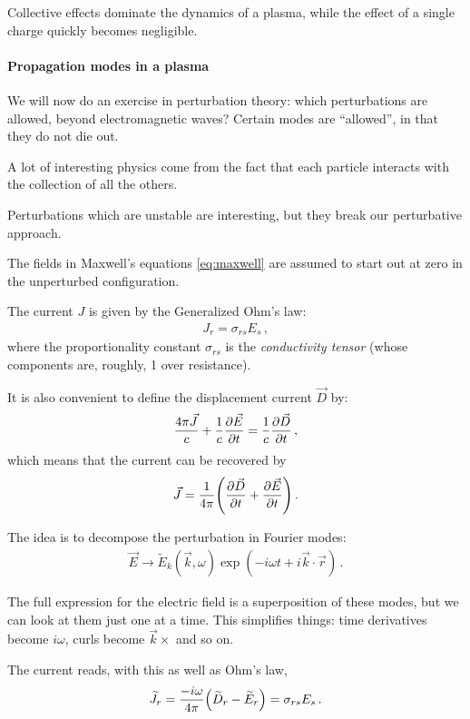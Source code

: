 \documentclass[main.tex]{subfiles}
\begin{document}
Collective effects dominate the dynamics of a plasma, while the effect of a single charge quickly becomes negligible.

\paragraph{Propagation modes in a plasma}

We will now do an exercise in perturbation theory: which perturbations are allowed, beyond electromagnetic waves? 
Certain modes are ``allowed'', in that they do not die out. 

A lot of interesting physics come from the fact that each particle interacts with the collection of all the others. 

Perturbations which are unstable are interesting, but they break our perturbative approach. 

The fields in Maxwell's equations \eqref{eq:maxwell} are assumed to start out at zero in the unperturbed configuration. 

The current \(J\) is given by the Generalized Ohm's law: 
%
\begin{align}
J_r = \sigma_{rs} E_s 
\,,
\end{align}
%
where the proportionality constant \(\sigma _{rs}\) is the \emph{conductivity tensor} (whose components are, roughly, 1 over resistance). 

It is also convenient to define the displacement current \(\vec{D}\) by:
%
\begin{align}
\frac{4 \pi \vec{J}}{c} + \frac{1}{c} \pdv{\vec{E}}{t} = \frac{1}{c} \pdv{\vec{D}}{t}
\,,
\end{align}
%
which means that the current can be recovered by 
%
\begin{align}
\vec{J} = \frac{1}{4 \pi } \qty(\pdv{\vec{D}}{t} + \pdv{\vec{E}}{t})
\,.
\end{align}

The idea is to decompose the perturbation in Fourier modes:
%
\begin{align}
 \vec{E} \to \widetilde{E}_k (\vec{k}, \omega ) \exp(- i \omega t + i \vec{k} \cdot \vec{r})
\,.
\end{align}

The full expression for the electric field is a superposition of these modes, but we can look at them just one at a time. 
This simplifies things: time derivatives become \(i \omega \), curls become \(\vec{k} \times \) and so on. 

The current reads, with this as well as Ohm's law,
%
\begin{align}
\widetilde{J} _r = \frac{- i \omega }{4 \pi } \qty(\widetilde{D}_r - \widetilde{E}_r) = \sigma_{rs} E_s
\,.
\end{align}
\end{document}
